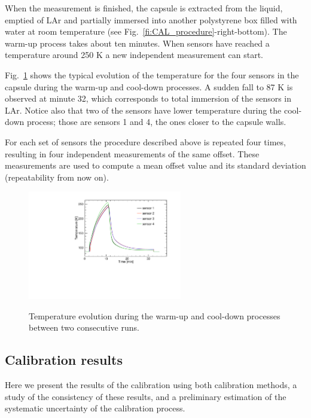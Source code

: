 When the measurement is finished, the capsule is extracted from the liquid, emptied of LAr and partially immersed into another polystyrene box filled with water at room temperature (see Fig.~\ref{fi:CAL_procedure}-right-bottom). The warm-up process takes about ten minutes. When sensors have reached a temperature around 250 K a new independent measurement can start. 

Fig.~\ref{fi:CAL_pre} shows the typical evolution of the temperature for the four sensors in the capsule during the warm-up and cool-down processes. A sudden fall to 87 K is observed at minute 32, which corresponds to total immersion of the sensors in LAr. Notice also that two of the sensors have lower temperature during the cool-down process; those are sensors 1 and 4, the ones closer to the capsule walls.  

For each set of sensors the procedure described above is repeated four times, resulting in four independent measurements of the same offset. These measurements are used to compute a mean offset value and its standard deviation (repeatability from now on).  

\begin{figure}[htbp]
\centering
{\includegraphics[width=0.6\textwidth]{images/figure_9.pdf}}
\caption{Temperature evolution during the warm-up and cool-down processes between two consecutive runs. }
\label{fi:CAL_pre}
\end{figure}


\subsection{Calibration results}
\label{sec:calib_results}
\noindent Here we present the results of the calibration using both calibration methods, a study of the consistency of these results, and a preliminary estimation of the systematic uncertainty of the calibration process.

